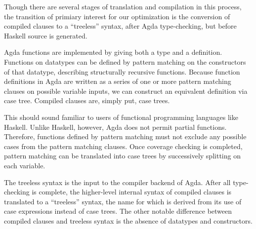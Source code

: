 Though there are several stages of translation and compilation in this process, the transition of primiary interest for our optimization is the conversion of compiled clauses to a ``treeless'' syntax, after Agda type-checking, but before Haskell source is generated.

Agda functions are implemented by giving both a type and a definition. Functions on datatypes can be defined by pattern matching on the constructors of that datatype, describing structurally recursive functions.\cite{agdawiki} %
Because function definitions in Agda are written as a series of one or more pattern matching clauses on possible variable inputs, we can construct an equivalent definition via case tree.\cite{agdawiki} %
Compiled clauses are, simply put, case trees.

This should sound familiar to users of functional programming languages like Haskell. Unlike Haskell, however, Agda does not permit partial functions. Therefore, functions defined by pattern matching must not exclude any possible cases from the pattern matching clauses.\cite{agdawiki} %
Once coverage checking is completed, pattern matching can be translated into case trees by successively splitting on each variable.\cite{agdahackage} %


The treeless syntax is the input to the compiler backend of Agda. After all type-checking is complete, the higher-level internal syntax of compiled clauses is translated to a ``treeless'' syntax, the name for which is derived from its use of case expressions instead of case trees. The other notable difference between compiled clauses and treeless syntax is the absence of datatypes and constructors.\cite{agdahackage} %

